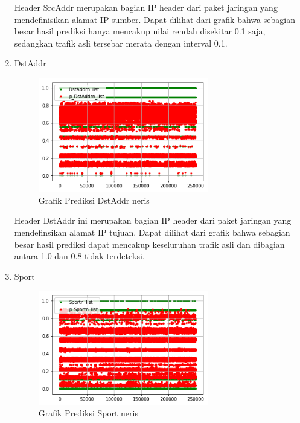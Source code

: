 \documentclass[./skripsi.tex]{subfiles}
\begin{document}
\begin{enumerate}
    \par Header SrcAddr merupakan bagian IP header dari paket jaringan yang mendefinisikan alamat IP sumber. Dapat dilihat dari grafik bahwa sebagian besar hasil prediksi hanya mencakup nilai rendah disekitar 0.1 saja, sedangkan trafik asli tersebar merata dengan interval 0.1.
    
    \item DstAddr
    \begin{figure}%
        \centering
        \includegraphics[width=0.7\textwidth]{public/assets/img/lstmm_neris_pred3.png}
        \caption{Grafik Prediksi DstAddr neris}
        \label{fig:lstmm_neris_pred3}
    \end{figure}
    
    \par Header DstAddr ini merupakan bagian IP header dari paket jaringan yang mendefinsikan alamat IP tujuan. Dapat dilihat dari grafik bahwa sebagian besar hasil prediksi dapat mencakup keseluruhan trafik asli dan dibagian antara 1.0 dan 0.8 tidak terdeteksi.
    
    \item Sport
    \begin{figure}%
        \centering
        \includegraphics[width=0.7\textwidth]{public/assets/img/lstmm_neris_pred4.png}
        \caption{Grafik Prediksi Sport neris}
        \label{fig:lstmm_neris_pred4}
    \end{figure}
    

\end{enumerate}
\end{document}

